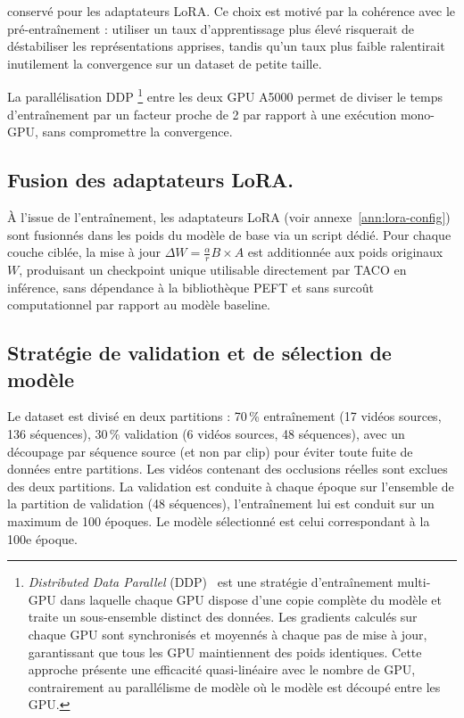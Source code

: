 conservé pour les adaptateurs LoRA. Ce choix est motivé par la cohérence avec le pré-entraînement : utiliser un taux d'apprentissage plus élevé risquerait de déstabiliser les représentations apprises, tandis qu'un taux plus faible ralentirait inutilement la convergence sur un dataset de petite taille.

La parallélisation DDP \footnote{\textit{Distributed Data Parallel} (DDP)~\cite{Li-DDP-2020}  est une stratégie d'entraînement multi-GPU dans laquelle chaque GPU dispose d'une copie complète du modèle et traite un sous-ensemble distinct des données. Les gradients calculés sur chaque GPU sont synchronisés et moyennés à chaque pas de mise à jour, garantissant que tous les GPU maintiennent des poids identiques. Cette approche présente une efficacité quasi-linéaire avec le nombre de GPU, contrairement au parallélisme de modèle où le modèle est découpé entre les GPU.} entre les deux GPU A5000 permet de diviser le temps d'entraînement par un facteur proche de 2 par rapport à une exécution mono-GPU, sans compromettre la convergence.

\subsection{Fusion des adaptateurs LoRA.}

À l'issue de l'entraînement, les adaptateurs LoRA (voir annexe~\ref{ann:lora-config}) sont fusionnés dans les poids du modèle de base via un script dédié. Pour chaque couche ciblée, la mise à jour $\Delta W = \frac{\alpha}{r} B \times A$ est additionnée aux poids originaux $W$, produisant un checkpoint unique utilisable directement par TACO en inférence, sans dépendance à la bibliothèque PEFT et sans surcoût computationnel par rapport au modèle baseline.

\subsection{Stratégie de validation et de sélection de modèle}

Le dataset est divisé en deux partitions : 70\,\% entraînement (17 vidéos sources, 136 séquences), 30\,\% validation (6 vidéos sources, 48 séquences), avec un découpage par séquence source (et non par clip) pour éviter toute fuite de données entre partitions. Les vidéos contenant des occlusions réelles sont exclues des deux partitions. La validation est conduite à chaque époque sur l'ensemble de la partition de validation (48 séquences), l'entraînement lui est conduit sur un maximum de 100 époques. Le modèle sélectionné est celui correspondant à la 100e époque.

